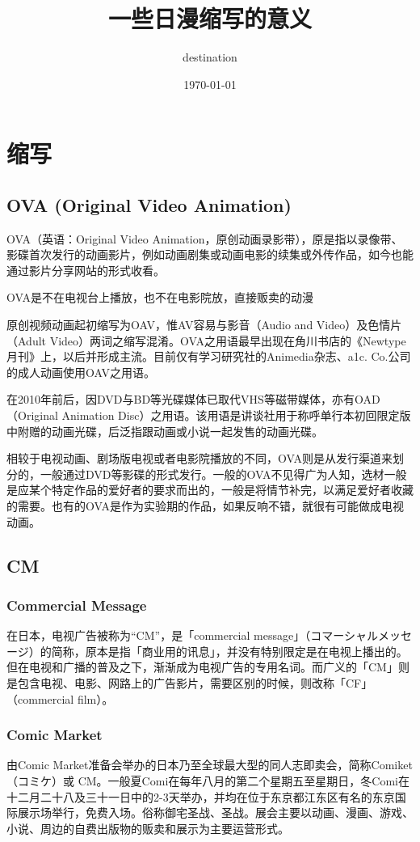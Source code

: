 \documentclass[UTF8,12pt]{ctexart}
\title{一些日漫缩写的意义}
\author{destination}
\date{\today}
\begin{document}
\maketitle
\section{缩写}
\subsection{OVA (Original Video Animation)}
OVA（英语：Original Video Animation，原创动画录影带），原是指以录像带、影碟首次发行的动画影片，例如动画剧集或动画电影的续集或外传作品，如今也能通过影片分享网站的形式收看。

OVA是不在电视台上播放，也不在电影院放，直接贩卖的动漫

原创视频动画起初缩写为OAV，惟AV容易与影音（Audio and Video）及色情片（Adult Video）两词之缩写混淆。OVA之用语最早出现在角川书店的《Newtype月刊》上，以后并形成主流。目前仅有学习研究社的Animedia杂志、a1c. Co.公司的成人动画使用OAV之用语。

在2010年前后，因DVD与BD等光碟媒体已取代VHS等磁带媒体，亦有OAD（Original Animation Disc）之用语。该用语是讲谈社用于称呼单行本初回限定版中附赠的动画光碟，后泛指跟动画或小说一起发售的动画光碟。

相较于电视动画、剧场版电视或者电影院播放的不同，OVA则是从发行渠道来划分的，一般通过DVD等影碟的形式发行。一般的OVA不见得广为人知，选材一般是应某个特定作品的爱好者的要求而出的，一般是将情节补完，以满足爱好者收藏的需要。也有的OVA是作为实验期的作品，如果反响不错，就很有可能做成电视动画。


\subsection{CM}
\subsubsection{Commercial Message}
在日本，电视广告被称为“CM”，是「commercial message」（コマーシャルメッセージ）的简称，原本是指「商业用的讯息」，并没有特别限定是在电视上播出的。但在电视和广播的普及之下，渐渐成为电视广告的专用名词。而广义的「CM」则是包含电视、电影、网路上的广告影片，需要区别的时候，则改称「CF」（commercial film）。

\subsubsection{Comic Market}
由Comic Market准备会举办的日本乃至全球最大型的同人志即卖会，简称Comiket（コミケ）或 CM。一般夏Comi在每年八月的第二个星期五至星期日，冬Comi在十二月二十八及三十一日中的2-3天举办，并均在位于东京都江东区有名的东京国际展示场举行，免费入场。俗称御宅圣战、圣战。展会主要以动画、漫画、游戏、小说、周边的自费出版物的贩卖和展示为主要运营形式。
\end{document}
